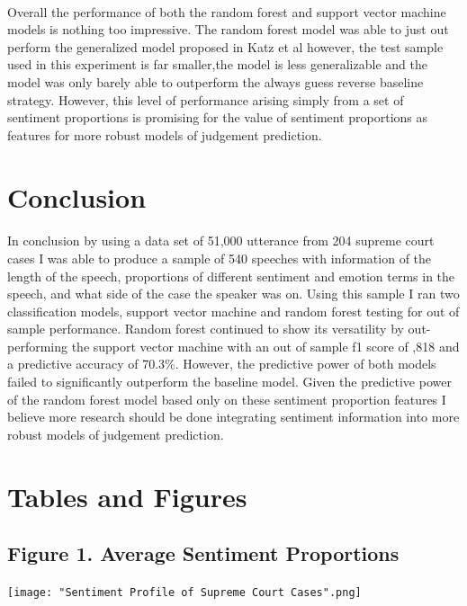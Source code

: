 \documentclass[12pt,english]{article}
\begin{document}
\paragraph{}
Overall the performance of both the random forest and support vector machine models is nothing too impressive. The random forest model was able to just out perform the generalized model proposed in Katz et al however, the test sample used in this experiment is far smaller,the model is less generalizable and the model was only barely able to outperform the always guess reverse baseline strategy. However, this level of performance arising simply from a set of sentiment proportions is promising for the value of sentiment proportions as features for more robust models of judgement prediction.
\section{Conclusion}
\paragraph{}
In conclusion by using a data set of 51,000 utterance from 204 supreme court cases I was able to produce a sample of 540 speeches with information of the length of the speech, proportions of different sentiment and emotion terms in the speech, and what side of the case the speaker was on. Using this sample I ran two classification models, support vector machine and random forest testing for out of sample performance. Random forest continued to show its versatility by out-performing the support vector machine with an out of sample f1 score of ,818 and a predictive accuracy of 70.3\%. However, the predictive power of both models failed to significantly outperform the baseline model. Given the predictive power of the random forest model based only on these sentiment proportion features I believe more research should be done integrating sentiment information into more robust models of judgement prediction.   
\pagebreak{}



\pagebreak{}
\section{Tables and Figures}
\subsection{Figure 1. Average Sentiment Proportions}
\begin{center}
\texttt{[image: "Sentiment Profile of Supreme Court
Cases".png]}
\end{center}
\end{document}
